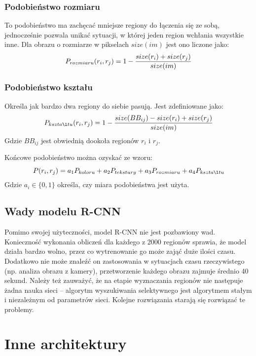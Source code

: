 \documentclass[a4paper,twoside,12pt]{book}
\begin{document}
{{}
\subsubsection{Podobieństwo rozmiaru}
{To podobieństwo ma zachęcać mniejsze regiony do łączenia się ze sobą, jednocześnie pozwala unikać sytuacji, w której jeden region wchłania wszystkie inne. Dla obrazu o rozmiarze w pikselach $size(im)$ jest ono liczone jako:
\begin{equation}
P_{rozmiaru}(r_{i},r_{j})= 1- \frac{size(r_{i})+size(r_{j})}{size(im)}\\
\end{equation}}
\subsubsection{Podobieństwo kształu}
{Określa jak bardzo dwa regiony do siebie pasują. Jest zdefiniowane jako:
\begin{equation}
P_{kształtu}(r_{i},r_{j})= 1- \frac{size(BB_{ij})- size(r_{i})+size(r_{j})}{size(im)}\\
\end{equation}
Gdzie $BB_{ij}$ jest obwiednią dookoła regionów $r_{i}$ i $r_{j}$.
}


{Końcowe podobieństwo można ozyskać ze wzoru:
\begin{equation}
P(r_{i},r_{j})= a_{1}P_{koloru}+a_{2}P_{tekstury}+a_{3}P_{rozmiaru}+a_{4}P_{kształtu}\\
\end{equation}
Gdzie $a_{i} \in  \{0,1\}$ określa, czy miara podobieństwa jest użyta.
}


\subsection{Wady modelu R-CNN}
{Pomimo swojej użyteczności, model R-CNN nie jest pozbawiony wad. Konieczność wykonania obliczeń dla każdego z 2000 regionów sprawia, że model działa bardzo wolno, przez co wytrenowanie go może zająć duże ilości czasu. Dodatkowo nie może znaleźć on zastosowania w sytuacjach czasu rzeczywistego (np. analiza obrazu z kamery), przetworzenie każdego obrazu zajmuje średnio 40 sekund. Należy też zauważyć, że na etapie wyznaczania regionów nie następuje żadna nauka sieci  –  algorytm wyszukiwania selektywnego jest algorytmem stałym i niezależnym od parametrów sieci. Kolejne rozwiązania starają się rozwiązać te problemy. }
\section{Inne architektury}
}
\end{document}
